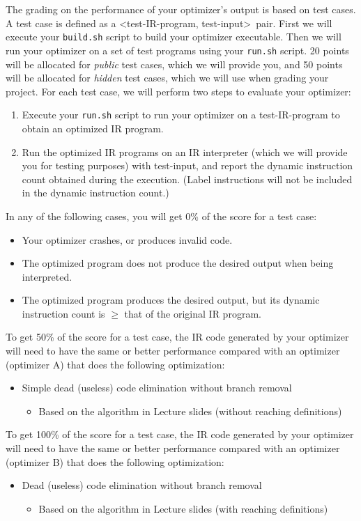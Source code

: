 \documentclass[12pt]{article}
\begin{document}
The grading on the performance of your optimizer's output is based on test cases.
A test case is defined as a \textless test-IR-program, test-input\textgreater~pair.
First we will execute your \texttt{build.sh} script to build your optimizer executable.
Then we will run your optimizer on a set of test programs using your \texttt{run.sh} script.  20 points will
be allocated for {\em public} test cases, which we will provide you, and 50
points will be allocated for {\em hidden} test cases, which we will
use when grading your project.  For each test case, we will perform
two steps to evaluate your optimizer:
\begin{enumerate}
\item Execute your  \texttt{run.sh} script to run your optimizer on a test-IR-program to obtain an optimized IR program.
\item Run the optimized IR programs on an IR interpreter (which we will
  provide you for testing purposes) with test-input, and report the
  dynamic instruction count obtained during the execution.  (Label
  instructions will not be included in the dynamic instruction count.)
\end{enumerate}

In any of the following cases, you will get 0\% of the score for a test case:
\begin{itemize}
\item Your optimizer crashes, or produces invalid code.
\item The optimized program does not produce the desired output when
  being interpreted.
\item The optimized program produces the desired output, but its
  dynamic instruction count is $\geq$ that of the original IR program.
\end{itemize}

To get 50\% of the score for a test case, the IR code generated by your optimizer will need to have the same or better performance compared with an optimizer (optimizer A) that does the following optimization:
\begin{itemize}
\item Simple dead (useless) code elimination without branch removal
\begin{itemize}
\item Based on the algorithm in Lecture slides (without reaching definitions)
\end{itemize}
\end{itemize}

To get 100\% of the score for a test case, the IR code generated by
your optimizer will need to have the same or better performance
compared with an optimizer (optimizer B) that does the following
optimization:
\begin{itemize}
\item Dead (useless) code elimination without branch removal
\begin{itemize}
\item Based on the algorithm in  Lecture slides (with reaching definitions)
\end{itemize}
\end{itemize}
\end{document}
